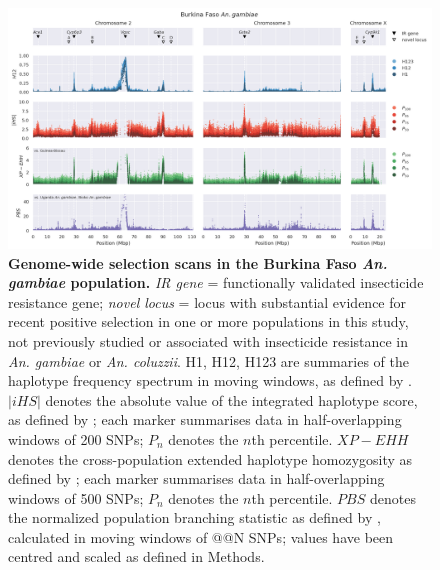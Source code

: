 \documentclass[a4paper,11pt,abstracton,hidelinks]{scrartcl}
\begin{document}
\begin{landscape}

\begin{figure}[t!]
	\begin{center}
		\includegraphics*[width=1\linewidth,center]{artwork/gwss_bf_gam_gw_ug_gam_gq_gam.png}
	\end{center}
	\caption{
	\textbf{Genome-wide selection scans in the Burkina Faso \textit{An. gambiae} population.} 
	\textit{IR gene} = functionally validated insecticide resistance gene; \textit{novel locus} = locus with substantial evidence for recent positive selection in one or more populations in this study, not previously studied or associated with insecticide resistance in \textit{An. gambiae} or \textit{An. coluzzii}. 
	H1, H12, H123 are summaries of the haplotype frequency spectrum in moving windows, as defined by \citet{Garud2015}. 
	$|iHS|$ denotes the absolute value of the integrated haplotype score, as defined by \citet{Voight2006}; each marker summarises data in half-overlapping windows of 200 SNPs; $P_{n}$ denotes the $n$th percentile. 
	$XP-EHH$ denotes the cross-population extended haplotype homozygosity as defined by \citet{Sabeti2007}; 	each marker summarises data in half-overlapping windows of 500 SNPs; $P_{n}$ denotes the $n$th percentile.
	$PBS$ denotes the normalized population branching statistic as defined by \citet{Crawford2017}, calculated in moving windows of @@N SNPs; values have been centred and scaled as defined in Methods.
	} 
	\label{fig:gwss_bf_gam}
\end{figure}



\end{landscape}
\end{document}
